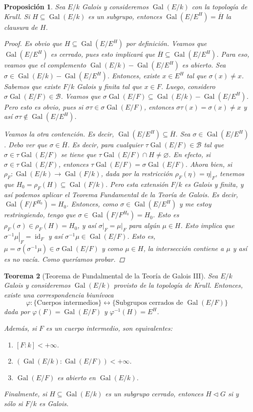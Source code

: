 \documentclass[12pt]{book}
\newtheorem{teo}{Teorema}[section]
\newtheorem{prop}[teo]{Proposición}
\theoremstyle{definition}
\let\emptyset\varnothing
\DeclareMathOperator{\id}{id}
\DeclareMathOperator{\Gal}{Gal}
\begin{document}
\begin{prop}
Sea $E/k$ Galois y consideremos $\Gal(E/k)$ con la topología de Krull. Si $H\subseteq \Gal(E/k)$ es un subgrupo, entonces $\Gal(E/E^H) = \overline{H}$ la clausura de $H$.
\begin{proof}
Es obvio que $H\subseteq\Gal(E/E^H)$ por definición. Veamos que $\Gal(E/E^H)$ es cerrado, pues esto implicará que $\overline{H}\subseteq\Gal(E/E^H)$. Para eso, veamos que el complemento $\Gal(E/k)-\Gal(E/E^H)$ es abierto. Sea $\sigma\in\Gal(E/k)-\Gal(E/E^H)$. Entonces, existe $x\in E^H$ tal que $\sigma(x)\neq x$. Sabemos que existe $F/k$ Galois y finita tal que $x\in F$. Luego, considero $\sigma\Gal(E/F)\in\mathscr{B}$. Veamos que $\sigma\Gal(E/F)\subseteq \Gal(E/k)-\Gal(E/E^H)$. Pero esto es obvio, pues si $\sigma\tau\in\sigma\Gal(E/F)$, entonces $\sigma\tau(x)=\sigma(x) \neq x$ y así $\sigma\tau\notin \Gal(E/E^H)$. 

Veamos la otra contención. Es decir, $\Gal(E/E^H)\subseteq \overline{H}$. Sea $\sigma\in\Gal(E/E^H)$. Debo ver que $\sigma\in\overline{H}$. Es decir, para cualquier $\tau\Gal(E/F)\in\mathscr{B}$ tal que $\sigma\in\tau\Gal(E/F)$ se tiene que $\tau\Gal(E/F)\cap H\neq \emptyset$. En efecto, si $\sigma\in\tau\Gal(E/F)$, entonces $\tau\Gal(E/F)=\sigma\Gal(E/F)$. Ahora bien, si $\rho_F:\Gal(E/k)\to\Gal(F/k)$, dada por la restricción $\rho_F(\eta)=\left.\eta\right|_F$, tenemos que $H_0=\rho_F(H)\subseteq \Gal(F/k)$. Pero esta extensión $F/k$ es Galois y finita, y así podemos aplicar el Teorema Fundamental de la Teoría de Galois. Es decir, $\Gal(F/F^{H_0})=H_0$. Entonces, como $\sigma\in\Gal(E/E^H)$ y me estoy restringiendo, tengo que $\sigma\in\Gal(F/F^{H_0})=H_0$. Esto es $\rho_F(\sigma)\in\rho_F(H)=H_0$, y así $\left.\sigma\right|_F = \left.\mu\right|_F$ para algún $\mu\in H$. Esto implica que $\left.\sigma^{-1}\mu\right|_F = \id_F$ y así $\sigma^{-1}\mu\in\Gal(E/F)$. Esto es, $\mu = \sigma(\sigma^{-1}\mu)\in\sigma\Gal(E/F)$ y como $\mu \in H$, la intersección contiene a $\mu$ y así es no vacía. Como queríamos probar.
\end{proof}
\end{prop}

\begin{teo}[Teorema de Fundalmental de la Teoría de Galois III]
Sea $E/k$ Galois y consideremos $\Gal(E/k)$ provisto de la topología de Krull. Entonces, existe una correspondencia biunívoca $$\varphi:\{\text{Cuerpos intermedios}\}\longleftrightarrow\{\text{Subgrupos cerrados de } \Gal(E/F)\}$$ dada por $\varphi(F)=\Gal(E/F)$ y $\varphi^{-1}(H)=E^H$. 

Además, si $F$ es un cuerpo intermedio, son equivalentes:
\begin{enumerate}
\item $[F:k]<+\infty$.
\item $(\Gal(E/k):\Gal(E/F))<+\infty$.
\item $\Gal(E/F)$ es abierto en $\Gal(E/k)$.
\end{enumerate}
Finalmente, si $H\subseteq \Gal(E/k)$ es un subgrupo cerrado, entonces $H\triangleleft G$ si y sólo si $F/k$ es Galois.
\end{teo}
\end{document}
